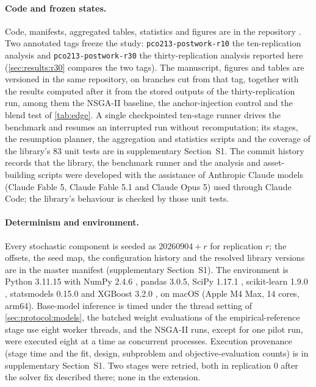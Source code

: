 \label{sec:repro}

\paragraph{Code and frozen states.} Code, manifests, aggregated tables, statistics and figures are in the repository
. Two annotated tags freeze the study: \texttt{pco213-\allowbreak postwork-\allowbreak r10}
the ten-replication analysis and \texttt{pco213-\allowbreak postwork-\allowbreak r30} the
thirty-replication analysis reported here (\cref{sec:results:r30} compares the two tags). The manuscript, figures and
tables are versioned in the same repository, on branches cut from that tag, together with the results computed after
it from the stored outputs of the thirty-replication run, among them the NSGA-II baseline, the anchor-injection control and the blend test of
\cref{tab:edge}. A single checkpointed ten-stage runner drives the benchmark and
resumes an interrupted run without recomputation; its stages, the resumption planner, the aggregation and statistics
scripts and the coverage of the library's 83 unit tests are in supplementary Section~S1. The commit history records
that the library, the benchmark runner and the analysis and asset-building scripts were developed with the assistance
of Anthropic Claude models (Claude Fable 5, Claude Fable 5.1 and Claude Opus 5) used through Claude Code; the
library's behaviour is checked by those unit tests.

\paragraph{Determinism and environment.} Every stochastic component is seeded as $\text{20260904} + r$ for
replication $r$; the offsets, the seed map, the configuration history and the resolved library versions are in the
master manifest (supplementary Section~S1). The environment is Python 3.11.15 with NumPy 2.4.6 \citep{harris2020numpy}, pandas 3.0.5,
SciPy 1.17.1 \citep{virtanen2020scipy}, scikit-learn 1.9.0 \citep{pedregosa2011scikit}, statsmodels 0.15.0 and
XGBoost 3.2.0 \citep{chen2016xgboost}, on macOS (Apple M4 Max, 14 cores, arm64). Base-model inference is timed under the thread setting of \cref{sec:protocol:models}, the batched weight evaluations of the empirical-reference stage use eight worker threads, and the NSGA-II runs, except for one pilot run, were executed eight at a time as concurrent processes. Execution provenance (stage time and the fit, design, subproblem and objective-evaluation counts) is in
supplementary Section~S1. Two stages were retried, both in replication 0 after the solver fix described there; none in the extension.

